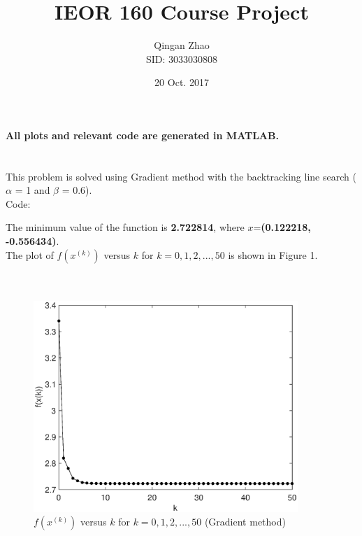 \documentclass[12pt]{article}
\title{IEOR 160 Course Project}
\date{20 Oct. 2017}
\author{Qingan Zhao \\ SID: 3033030808}
\begin{document}
\maketitle
\newcommand{\ud}{\mathrm d} %
\renewcommand\theequation{\arabic{equation}}
\renewcommand{\figurename}{Fig.}
\renewcommand\thesection{Problem \arabic{section}}
\renewcommand\thesubsection{\alph{subsection} )}

\begin{large}
\noindent\textbf{All plots and relevant code are generated in MATLAB.}
\end{large}

\section{}

This problem is solved using Gradient method with the backtracking line search ($\alpha$ = 1 and $\beta$ = 0.6).\\

\noindent Code:



\bigskip\noindent The minimum value of the function is \textbf{2.722814}, where $x$=\textbf{(0.122218, -0.556434)}.\\

\noindent The plot of $f(x^{(k)})$ versus $k$ for $k=0,1,2,...,50$ is shown in Figure 1.\\\\\\

\begin{figure}[!htbp]
	\centering
	\includegraphics[width=10cm]{figures/fig1.eps}      
	\caption{$f(x^{(k)})$ versus $k$ for $k=0,1,2,...,50$ (Gradient method)}
\end{figure}
\end{document}
